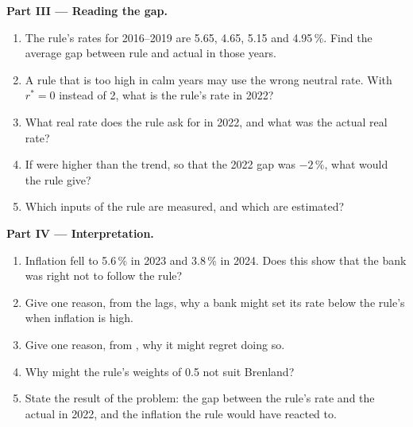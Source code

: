 \begin{problem}
\medskip
\noindent\textbf{Part III --- Reading the gap.}
\begin{enumerate}[resume]
\item The rule's rates for 2016--2019 are 5.65, 4.65, 5.15 and 4.95\,\%. Find the average gap between rule and actual in those years.
\item A rule that is too high in calm years may use the wrong neutral rate. With $r^* = 0$ instead of 2, what is the rule's rate in 2022?
\item What real rate does the rule ask for in 2022, and what was the actual real rate?
\item If  were higher than the trend, so that the 2022 gap was $-2\,\%$, what would the rule give?
\item Which inputs of the rule are measured, and which are estimated?
\end{enumerate}

\medskip
\noindent\textbf{Part IV --- Interpretation.}
\begin{enumerate}[resume]
\item Inflation fell to 5.6\,\% in 2023 and 3.8\,\% in 2024. Does this show that the bank was right not to follow the rule?
\item Give one reason, from the lags, why a bank might set its rate below the rule's when inflation is high.
\item Give one reason, from , why it might regret doing so.
\item Why might the rule's weights of 0.5 not suit Brenland?
\item State the result of the problem: the gap between the rule's rate and the actual  in 2022, and the inflation the rule would have reacted to.
\end{enumerate}
\end{problem}
